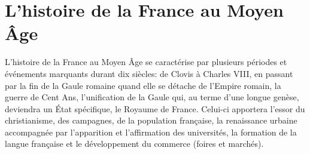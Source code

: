\documentclass[french,11pt]{article}
\begin{document}
\section*{L'histoire de la France au Moyen Âge}
L'histoire de la France au Moyen Âge se 
caractérise par plusieurs périodes et événements 
marquants durant dix siècles: de Clovis à 
Charles VIII, en passant par la fin de la 
Gaule romaine quand elle se détache de 
l'Empire romain, la guerre de Cent Ans, 
l'unification de la Gaule qui, au terme d'une
longue genèse, deviendra un État spécifique, 
le Royaume de France. Celui-ci apportera l'essor
 du christianisme, des campagnes, de la 
 population française, la renaissance 
 urbaine accompagnée par l'apparition 
 et l'affirmation des universités, la 
 formation de la langue française et 
 le développement du commerce (foires 
 et marchés).
\end{document}
